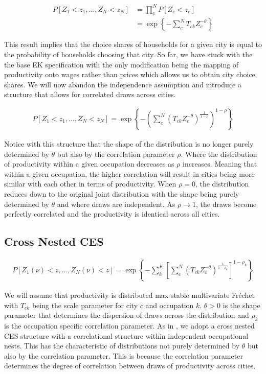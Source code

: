 \documentclass[10pt]{article}
\begin{document}
\begin{align*}
    P[Z_1 < z_1, \dots, Z_N < z_N] & = \prod_{c}^{N} P[Z_c < z_c]                                 \\
                                   & = \exp \left\{ - \sum_{c}^{N} T_{ck} Z_c^{- \theta} \right\}
\end{align*}

This result implies that the choice shares of households for a given city is equal to the probability of households choosing that city. So far, we have stuck with the the base EK specification with the only modification being the mapping of productivity onto wages rather than prices which allows us to obtain city choice shares. We will now abandon the independence assumption and introduce a structure that allows for correlated draws across cities.

\begin{align*}
    P[Z_1 < z_1, \dots, Z_N < z_N] = \exp \left\{ - \left( \sum_{c}^{N} (T_{ck} Z_c^{- \theta})^{\frac{1}{1 - \rho}} \right)^{1 - \rho} \right\}
\end{align*}

Notice with this structure that the shape of the distribution is no longer purely determined by $\theta$ but also by the correlation parameter $\rho$. Where the distribution of productivity within a given occupation decreases as $\rho$ increases. Meaning that within a given occupation, the higher correlation will result in cities being more similar with each other in terms of productivity. When $\rho = 0$, the distribution reduces down to the original joint distribution with the shape being purely determined by $\theta$ and where draws are independent. As $\rho \rightarrow 1$, the draws become perfectly correlated and the productivity is identical across all cities.

\subsection{Cross Nested CES}

\begin{align}
    P[Z_1(\nu) < z, \dots, Z_N(\nu) < z] = \exp \left\{ - \sum_{k}^{K} \left[ \sum_{c}^{N} (T_{ck} Z_c^{- \theta})^{\frac{1}{1 - \rho_k}} \right]^{1 - \rho_k} \right\}
\end{align}

We will assume that productivity is distributed max stable multivariate Fr\'{e}chet with $T_{ck}$ being the scale parameter for city $c$ and occupation $k$. $\theta > 0$ is the shape parameter that determines the dispersion of draws across the distribution and $\rho_k$ is the occupation specific correlation parameter. As in \cite{lindandramondo}, we adopt a cross nested CES structure with a correlational structure within independent occupational nests. This has the characteristic of distributions not purely determined by $\theta$ but also by the correlation parameter. This is because the correlation parameter determines the degree of correlation between draws of productivity across cities.
\end{document}
